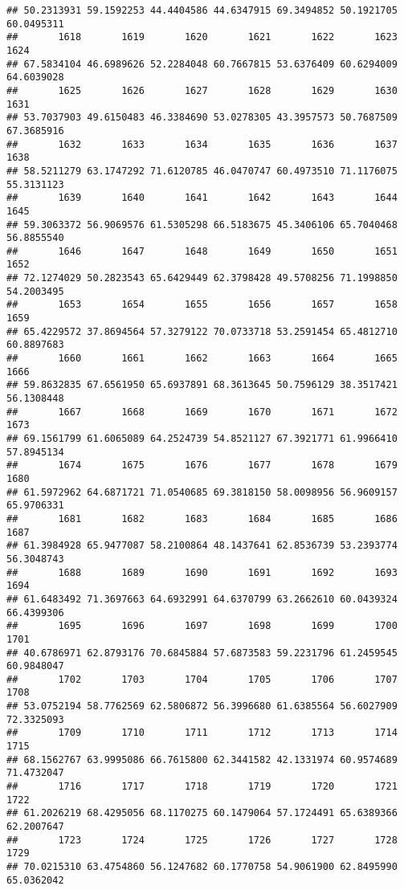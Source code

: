 \documentclass[
]{article}
\begin{document}
\begin{verbatim}
## 50.2313931 59.1592253 44.4404586 44.6347915 69.3494852 50.1921705 60.0495311 
##       1618       1619       1620       1621       1622       1623       1624 
## 67.5834104 46.6989626 52.2284048 60.7667815 53.6376409 60.6294009 64.6039028 
##       1625       1626       1627       1628       1629       1630       1631 
## 53.7037903 49.6150483 46.3384690 53.0278305 43.3957573 50.7687509 67.3685916 
##       1632       1633       1634       1635       1636       1637       1638 
## 58.5211279 63.1747292 71.6120785 46.0470747 60.4973510 71.1176075 55.3131123 
##       1639       1640       1641       1642       1643       1644       1645 
## 59.3063372 56.9069576 61.5305298 66.5183675 45.3406106 65.7040468 56.8855540 
##       1646       1647       1648       1649       1650       1651       1652 
## 72.1274029 50.2823543 65.6429449 62.3798428 49.5708256 71.1998850 54.2003495 
##       1653       1654       1655       1656       1657       1658       1659 
## 65.4229572 37.8694564 57.3279122 70.0733718 53.2591454 65.4812710 60.8897683 
##       1660       1661       1662       1663       1664       1665       1666 
## 59.8632835 67.6561950 65.6937891 68.3613645 50.7596129 38.3517421 56.1308448 
##       1667       1668       1669       1670       1671       1672       1673 
## 69.1561799 61.6065089 64.2524739 54.8521127 67.3921771 61.9966410 57.8945134 
##       1674       1675       1676       1677       1678       1679       1680 
## 61.5972962 64.6871721 71.0540685 69.3818150 58.0098956 56.9609157 65.9706331 
##       1681       1682       1683       1684       1685       1686       1687 
## 61.3984928 65.9477087 58.2100864 48.1437641 62.8536739 53.2393774 56.3048743 
##       1688       1689       1690       1691       1692       1693       1694 
## 61.6483492 71.3697663 64.6932991 64.6370799 63.2662610 60.0439324 66.4399306 
##       1695       1696       1697       1698       1699       1700       1701 
## 40.6786971 62.8793176 70.6845884 57.6873583 59.2231796 61.2459545 60.9848047 
##       1702       1703       1704       1705       1706       1707       1708 
## 53.0752194 58.7762569 62.5806872 56.3996680 61.6385564 56.6027909 72.3325093 
##       1709       1710       1711       1712       1713       1714       1715 
## 68.1562767 63.9995086 66.7615800 62.3441582 42.1331974 60.9574689 71.4732047 
##       1716       1717       1718       1719       1720       1721       1722 
## 61.2026219 68.4295056 68.1170275 60.1479064 57.1724491 65.6389366 62.2007647 
##       1723       1724       1725       1726       1727       1728       1729 
## 70.0215310 63.4754860 56.1247682 60.1770758 54.9061900 62.8495990 65.0362042 

\end{verbatim}
\end{document}
